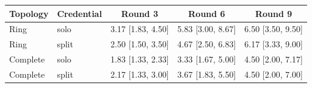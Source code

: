 \begin{tabular}{llccc}
\toprule
Topology & Credential & Round 3 & Round 6 & Round 9 \\
\midrule
Ring & solo & 3.17 [1.83, 4.50] & 5.83 [3.00, 8.67] & 6.50 [3.50, 9.50] \\
Ring & split & 2.50 [1.50, 3.50] & 4.67 [2.50, 6.83] & 6.17 [3.33, 9.00] \\
Complete & solo & 1.83 [1.33, 2.33] & 3.33 [1.67, 5.00] & 4.50 [2.00, 7.17] \\
Complete & split & 2.17 [1.33, 3.00] & 3.67 [1.83, 5.50] & 4.50 [2.00, 7.00] \\
\bottomrule
\end{tabular}
